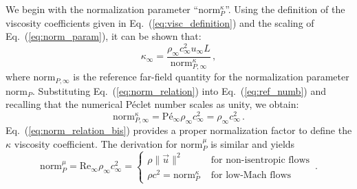 \documentclass[review,10pt]{elsarticle}
\newcommand{\norm}{\textrm{norm}}
\renewcommand{\Re}{\textrm{Re}}
\newcommand{\Pe}{\textrm{P\'e}}
\newcommand{\eqt}[1]{Eq.~(\ref{#1})}                     %
\begin{document}
We begin with the  normalization parameter ``$\norm_P^\kappa$''. Using the 
definition of the viscosity coefficients given in \eqt{eq:visc_definition} and the scaling of 
\eqt{eq:norm_param}, it can be shown that:
%
\begin{equation}
\label{eq:norm_relation}
\kappa_\infty = \frac{ \rho_\infty c_\infty^2 u_\infty L }{ \norm_{P,\infty}^{\kappa} } \, ,
\end{equation}
%
where $\norm_{P,\infty}$ is the reference far-field quantity for the normalization parameter $\norm_P$. 
Substituting \eqt{eq:norm_relation} into \eqt{eq:ref_numb} and recalling that the numerical P\'eclet 
number scales as unity, we obtain:
%
\begin{equation}
\label{eq:norm_relation_bis}
\norm_{P,\infty}^{\kappa} = \Pe_\infty \rho_\infty c_\infty^2 = \rho_\infty c_\infty^2 \, .
\end{equation}
%
\eqt{eq:norm_relation_bis} provides a proper normalization factor to define the $\kappa$ viscosity coefficient.
%
The derivation for $\norm_P^\mu$ is similar and yields
\begin{equation}
\label{eq:norm_ent2}
\norm_P^\mu = \Re_\infty \rho_\infty c_\infty^2 =  \left\{
\begin{array}{ll}
 \rho \|\vec{u} \|^2       & \text{ for non-isentropic flows} \\
 \rho c^2 = \norm_P^\kappa & \text{ for low-Mach flows}
\end{array}
\right. \,.
\end{equation}
\end{document}
